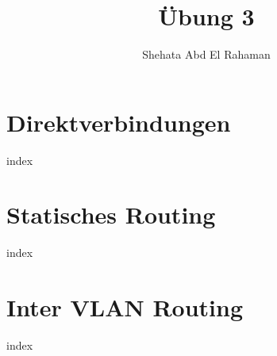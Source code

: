\documentclass[12pt,letterpaper]{article}
\title{\"Ubung 3}
\author{Shehata Abd El Rahaman}
\date{}
\begin{document}
\maketitle

\tableofcontents

\clearpage
\pagebreak
\section{Direktverbindungen}
{index}
\clearpage
\pagebreak
\section{Statisches Routing}
{index}
\clearpage
\pagebreak
\section{Inter VLAN Routing}
{index}
\end{document}
